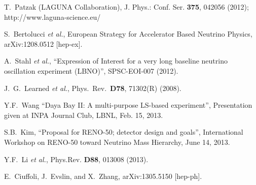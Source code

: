 T.\ Patzak (LAGUNA Collaboration), J. Phys.: Conf. Ser. \textbf{375},
042056 (2012);\\
http://www.laguna-science.eu/

S.\ Bertolucci {\em et al.}, European Strategy for Accelerator Based
Neutrino Physics, arXiv:1208.0512 [hep-ex].

A.\ Stahl {\em et al.}, 
``Expression of Interest for a very long baseline neutrino
oscillation experiment (LBNO)'', SPSC-EOI-007 (2012). 

 J.~G.~Learned {\it et al.}, 
Phys.\ Rev.\ {\bf D78}, 71302(R) (2008).

 Y.F.~Wang ``Daya Bay II: A multi-purpose
LS-based experiment'', Presentation given at INPA Journal Club, LBNL,
Feb. 15, 2013.

S.B.~Kim, ``Proposal for RENO-50; detector design and goals'',
International Workshop on RENO-50 toward Neutrino Mass Hierarchy, 
June 14, 2013.


 Y.F.~Li {\it et al.}, 
Phys.Rev. \textbf{D88}, 013008 (2013).

E.~Ciuffoli, J.~Evslin, and X.~Zhang, 
arXiv:1305.5150 [hep-ph]. 






